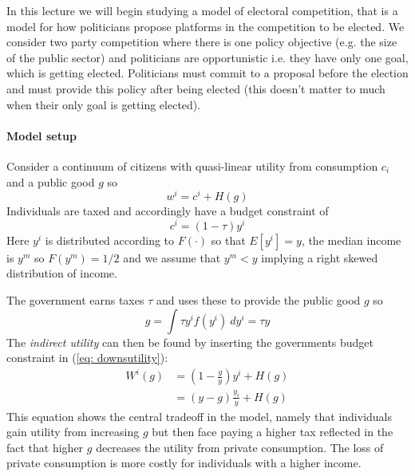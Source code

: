 In this lecture we will begin studying a model of electoral competition, that is a model for how politicians propose platforms in the competition to be elected. We consider two party competition where there is one policy objective (e.g. the size of the public sector) and politicians are opportunistic i.e. they have only one goal, which is getting elected. Politicians must commit to a proposal before the election and must provide this policy after being elected (this doesn't matter to much when their only goal is getting elected). 

\paragraph{Model setup} Consider a continuum of citizens with quasi-linear utility from consumption $c_i$ and a public good $g$ so 
\begin{equation} \label{eq: downsutility}
    w^i = c^i + H(g)
\end{equation}
Individuals are taxed and accordingly have a budget constraint of  
\begin{equation}
    c^i=(1-\tau)y^i
\end{equation}
Here $y^i$ is distributed according to $F(\cdot)$ so that $E[y^i]=y$, the median income is $y^m$ so $F(y^m)=1/2$ and we assume that $y^m < y$ implying a right skewed distribution of income. 

The government earns taxes $\tau$ and uses these to provide the public good $g$ so 
\begin{equation}
    g = \int \tau y^i f(y^i) \ dy^i = \tau y
\end{equation} 
The \textit{indirect utility} can then be found by inserting the governments budget constraint in (\ref{eq: downsutility}):
\begin{equation} \label{eq: indirectutilityDowns}
    \begin{split}
    W^i(g) &= \left(1 - \frac{g}{y}\right)y^i + H(g) \\ 
    &= (y-g)\frac{y_i}{y} + H(g)
    \end{split}
\end{equation}
This equation shows the central tradeoff in the model, namely that individuals gain utility from increasing $g$ but then face paying a higher tax reflected in the fact that higher $g$ decreases the utility from private consumption. The loss of private consumption is more costly for individuals with a higher income.

